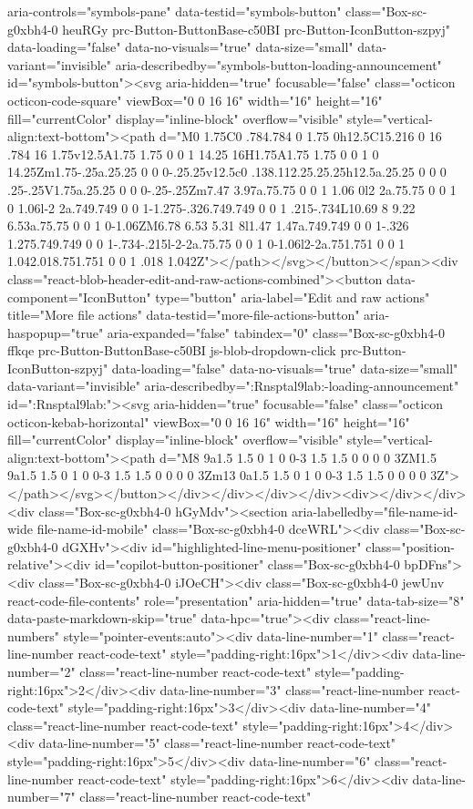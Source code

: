 {{{{{{{{{{{{{{{{{{{{{{{{{{{{{{{aria-controls="symbols-pane" data-testid="symbols-button" class="Box-sc-g0xbh4-0 heuRGy prc-Button-ButtonBase-c50BI prc-Button-IconButton-szpyj" data-loading="false" data-no-visuals="true" data-size="small" data-variant="invisible" aria-describedby="symbols-button-loading-announcement" id="symbols-button"><svg aria-hidden="true" focusable="false" class="octicon octicon-code-square" viewBox="0 0 16 16" width="16" height="16" fill="currentColor" display="inline-block" overflow="visible" style="vertical-align:text-bottom"><path d="M0 1.75C0 .784.784 0 1.75 0h12.5C15.216 0 16 .784 16 1.75v12.5A1.75 1.75 0 0 1 14.25 16H1.75A1.75 1.75 0 0 1 0 14.25Zm1.75-.25a.25.25 0 0 0-.25.25v12.5c0 .138.112.25.25.25h12.5a.25.25 0 0 0 .25-.25V1.75a.25.25 0 0 0-.25-.25Zm7.47 3.97a.75.75 0 0 1 1.06 0l2 2a.75.75 0 0 1 0 1.06l-2 2a.749.749 0 0 1-1.275-.326.749.749 0 0 1 .215-.734L10.69 8 9.22 6.53a.75.75 0 0 1 0-1.06ZM6.78 6.53 5.31 8l1.47 1.47a.749.749 0 0 1-.326 1.275.749.749 0 0 1-.734-.215l-2-2a.75.75 0 0 1 0-1.06l2-2a.751.751 0 0 1 1.042.018.751.751 0 0 1 .018 1.042Z"></path></svg></button></span><div class="react-blob-header-edit-and-raw-actions-combined"><button data-component="IconButton" type="button" aria-label="Edit and raw actions" title="More file actions" data-testid="more-file-actions-button" aria-haspopup="true" aria-expanded="false" tabindex="0" class="Box-sc-g0xbh4-0 ffkqe prc-Button-ButtonBase-c50BI js-blob-dropdown-click prc-Button-IconButton-szpyj" data-loading="false" data-no-visuals="true" data-size="small" data-variant="invisible" aria-describedby=":Rnsptal9lab:-loading-announcement" id=":Rnsptal9lab:"><svg aria-hidden="true" focusable="false" class="octicon octicon-kebab-horizontal" viewBox="0 0 16 16" width="16" height="16" fill="currentColor" display="inline-block" overflow="visible" style="vertical-align:text-bottom"><path d="M8 9a1.5 1.5 0 1 0 0-3 1.5 1.5 0 0 0 0 3ZM1.5 9a1.5 1.5 0 1 0 0-3 1.5 1.5 0 0 0 0 3Zm13 0a1.5 1.5 0 1 0 0-3 1.5 1.5 0 0 0 0 3Z"></path></svg></button></div></div></div></div><div></div></div><div class="Box-sc-g0xbh4-0 hGyMdv"><section aria-labelledby="file-name-id-wide file-name-id-mobile" class="Box-sc-g0xbh4-0 dceWRL"><div class="Box-sc-g0xbh4-0 dGXHv"><div id="highlighted-line-menu-positioner" class="position-relative"><div id="copilot-button-positioner" class="Box-sc-g0xbh4-0 bpDFns"><div class="Box-sc-g0xbh4-0 iJOeCH"><div class="Box-sc-g0xbh4-0 jewUnv react-code-file-contents" role="presentation" aria-hidden="true" data-tab-size="8" data-paste-markdown-skip="true" data-hpc="true"><div class="react-line-numbers" style="pointer-events:auto"><div data-line-number="1" class="react-line-number react-code-text" style="padding-right:16px">1</div><div data-line-number="2" class="react-line-number react-code-text" style="padding-right:16px">2</div><div data-line-number="3" class="react-line-number react-code-text" style="padding-right:16px">3</div><div data-line-number="4" class="react-line-number react-code-text" style="padding-right:16px">4</div><div data-line-number="5" class="react-line-number react-code-text" style="padding-right:16px">5</div><div data-line-number="6" class="react-line-number react-code-text" style="padding-right:16px">6</div><div data-line-number="7" class="react-line-number react-code-text" }}}}}}}}}}}}}}}}}}}}}}}}}}}}}}}
